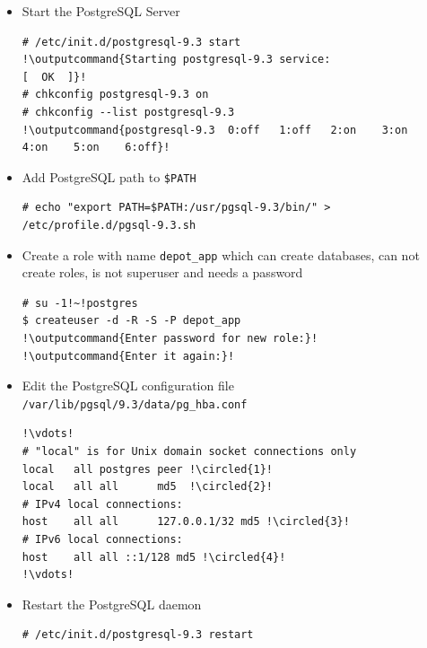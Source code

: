 \documentclass{beamer}
\newcommand*\circled[1]{\tikz[baseline=(char.base)]{
            \node[shape=circle,draw,inner sep=2pt] (char) {#1};}}
\newcommand{\outputcommand}[1]{\color{darkgreen}{#1}}
\begin{document}
\begin{frame}
\begin{itemize}
\lstset{language=shell, escapechar=!}Finally \dots
\begin{lstlisting}[escapechar=!]
# ls /var/lib/pgsql/9.3/data/*
!\outputcommand{A lot of stuff}!
\end{lstlisting}

\item Start the PostgreSQL Server

\lstset{language=shell, escapechar=!}
\begin{lstlisting}[escapechar=!]
# /etc/init.d/postgresql-9.3 start
!\outputcommand{Starting postgresql-9.3 service:                           [  OK  ]}!
# chkconfig postgresql-9.3 on
# chkconfig --list postgresql-9.3
!\outputcommand{postgresql-9.3 	0:off	1:off	2:on	3:on	4:on	5:on	6:off}!
\end{lstlisting}

\item Add PostgreSQL path to \texttt{\$PATH}

\lstset{language=shell, escapechar=!}
\begin{lstlisting}[escapechar=!]
# echo "export PATH=$PATH:/usr/pgsql-9.3/bin/" > /etc/profile.d/pgsql-9.3.sh
\end{lstlisting}

\item Create a role with name \texttt{depot\_app} which can create databases, can not create roles, is not superuser and needs a password

\lstset{language=shell}
\begin{lstlisting}[escapechar=!]
# su -1!~!postgres
$ createuser -d -R -S -P depot_app
!\outputcommand{Enter password for new role:}!
!\outputcommand{Enter it again:}!
\end{lstlisting}

\item Edit the PostgreSQL configuration file \texttt{/var/lib/pgsql/9.3/data/pg\_hba.conf}

\lstset{language=shell, escapechar=!, numbers=left}
\begin{lstlisting}[escapechar=!]
!\vdots!
# "local" is for Unix domain socket connections only
local   all postgres peer !\circled{1}!
local   all all      md5  !\circled{2}!
# IPv4 local connections:
host    all all      127.0.0.1/32 md5 !\circled{3}!
# IPv6 local connections:
host    all all ::1/128 md5 !\circled{4}!
!\vdots!
\end{lstlisting}

\item Restart the PostgreSQL daemon

\lstset{language=shell, escapechar=!}
\begin{lstlisting}[escapechar=!]
# /etc/init.d/postgresql-9.3 restart
\end{lstlisting}

\end{itemize}
\end{frame}
\end{document}

